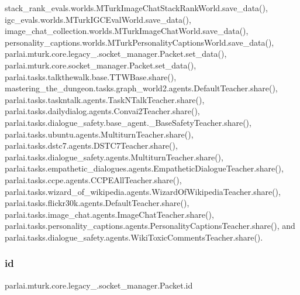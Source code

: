 stack\+\_\+rank\+\_\+evals.\+worlds.\+M\+Turk\+Image\+Chat\+Stack\+Rank\+World.\+save\+\_\+data(), igc\+\_\+evals.\+worlds.\+M\+Turk\+I\+G\+C\+Eval\+World.\+save\+\_\+data(), image\+\_\+chat\+\_\+collection.\+worlds.\+M\+Turk\+Image\+Chat\+World.\+save\+\_\+data(), personality\+\_\+captions.\+worlds.\+M\+Turk\+Personality\+Captions\+World.\+save\+\_\+data(), parlai.\+mturk.\+core.\+legacy\+\_.\+socket\+\_\+manager.\+Packet.\+set\+\_\+data(), parlai.\+mturk.\+core.\+socket\+\_\+manager.\+Packet.\+set\+\_\+data(), parlai.\+tasks.\+talkthewalk.\+base.\+T\+T\+W\+Base.\+share(), mastering\+\_\+the\+\_\+dungeon.\+tasks.\+graph\+\_\+world2.\+agents.\+Default\+Teacher.\+share(), parlai.\+tasks.\+taskntalk.\+agents.\+Task\+N\+Talk\+Teacher.\+share(), parlai.\+tasks.\+dailydialog.\+agents.\+Convai2\+Teacher.\+share(), parlai.\+tasks.\+dialogue\+\_\+safety.\+base\+\_\+agent.\+\_\+\+Base\+Safety\+Teacher.\+share(), parlai.\+tasks.\+ubuntu.\+agents.\+Multiturn\+Teacher.\+share(), parlai.\+tasks.\+dstc7.\+agents.\+D\+S\+T\+C7\+Teacher.\+share(), parlai.\+tasks.\+dialogue\+\_\+safety.\+agents.\+Multiturn\+Teacher.\+share(), parlai.\+tasks.\+empathetic\+\_\+dialogues.\+agents.\+Empathetic\+Dialogue\+Teacher.\+share(), parlai.\+tasks.\+ccpe.\+agents.\+C\+C\+P\+E\+All\+Teacher.\+share(), parlai.\+tasks.\+wizard\+\_\+of\+\_\+wikipedia.\+agents.\+Wizard\+Of\+Wikipedia\+Teacher.\+share(), parlai.\+tasks.\+flickr30k.\+agents.\+Default\+Teacher.\+share(), parlai.\+tasks.\+image\+\_\+chat.\+agents.\+Image\+Chat\+Teacher.\+share(), parlai.\+tasks.\+personality\+\_\+captions.\+agents.\+Personality\+Captions\+Teacher.\+share(), and parlai.\+tasks.\+dialogue\+\_\+safety.\+agents.\+Wiki\+Toxic\+Comments\+Teacher.\+share().

\mbox{\label{classparlai_1_1mturk_1_1core_1_1legacy__2018_1_1socket__manager_1_1Packet_ae539e80c978b6fa4ac0332cb8fdb4459}} 
\subsubsection{\texorpdfstring{id}{id}}
{\footnotesize\ttfamily parlai.\+mturk.\+core.\+legacy\+\_.\+socket\+\_\+manager.\+Packet.\+id}



